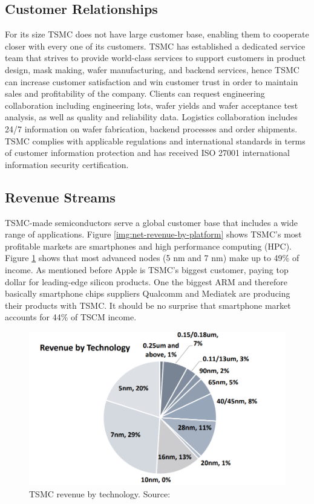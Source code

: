 \documentclass[a4paper,12pt]{article}
\begin{document}
\subsection{Customer Relationships}
For its size TSMC does not have large customer base, enabling them to cooperate closer with every one of its customers.
TSMC has established a dedicated service team that strives to provide world-class services to support customers in product design, mask making, wafer manufacturing, and backend services, hence TSMC can increase customer satisfaction and win customer trust in order to maintain sales and profitability of the company.
Clients can request engineering collaboration including engineering lots, wafer yields and wafer acceptance test analysis, as well as quality and reliability data.
Logistics collaboration includes 24/7 information on wafer fabrication, backend processes and order shipments. 
TSMC complies with applicable regulations and international standards in terms of customer information protection and has
received ISO 27001 international information security certification.

\subsection{Revenue Streams}


TSMC-made semiconductors serve a global customer base that includes a wide
range of applications. 
Figure \ref{img:net-revenue-by-platform} shows TSMC's most profitable markets are smartphones and high performance computing (HPC).
Figure \ref{img:net-revenue-by-technology} shows that most advanced nodes (5 nm and 7 nm) make up to 49\% of income.  
As mentioned before Apple is TSMC's biggest customer, paying top dollar for leading-edge silicon products. 
One the biggest ARM and therefore basically smartphone chips suppliers Qualcomm and Mediatek are producing their products with TSMC.
It should be no surprise that smartphone market accounts for 44\% of TSCM income.


\begin{figure}
    \includegraphics[width=0.9\linewidth]{RevenueByTechnology.png}
    \caption{TSMC revenue by technology. Source: \cite{TSMCInvestmentRecomendation}}
    \label{img:net-revenue-by-technology}
\end{figure}
\end{document}
